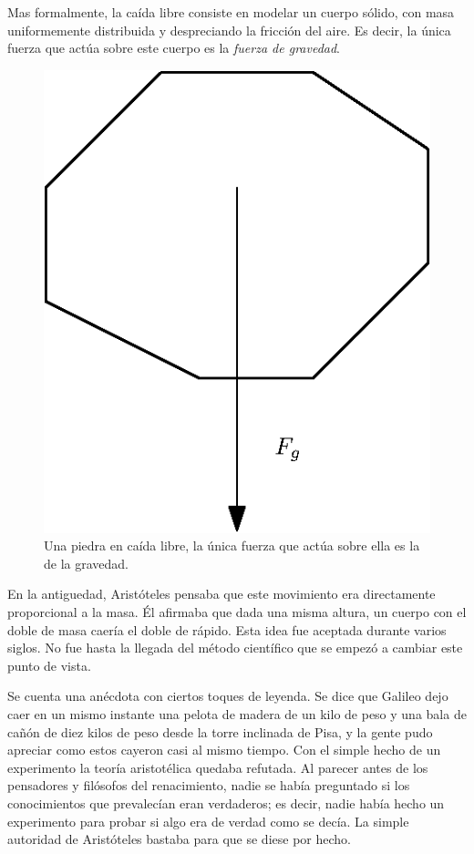Mas formalmente, la caída libre consiste en modelar un cuerpo sólido, con masa uniformemente distribuida y despreciando la fricción del aire.
Es decir, la única fuerza que actúa sobre este cuerpo es la \emph{fuerza de gravedad}.

\begin{figure}
 \centering
 \includegraphics[]{Img/01/caida_libre}
 \caption[Ejemplo de caída libre]{ 
 Una piedra en caída libre, la única fuerza que actúa sobre ella es la de la gravedad.
 } \label{piedra:fig}
\end{figure}

En la antiguedad, Aristóteles pensaba que este movimiento era directamente proporcional a la masa.
Él afirmaba que dada una misma altura, un cuerpo con el doble de masa caería el doble de rápido.
Esta idea fue aceptada durante varios siglos.
No fue hasta la llegada del método científico que se empezó a cambiar este punto de vista.

Se cuenta una anécdota con ciertos toques de leyenda.
Se dice que Galileo dejo caer en un mismo instante una pelota de madera de un kilo de peso y una bala de cañón de diez kilos de peso desde la torre inclinada de Pisa, y la gente pudo apreciar como estos cayeron casi al mismo tiempo.
Con el simple hecho de un experimento la teoría aristotélica quedaba refutada.
Al parecer antes de los pensadores y filósofos del renacimiento, nadie se había preguntado si los conocimientos que prevalecían eran verdaderos; es decir, nadie había hecho un experimento para probar si algo era de verdad como se decía.
La simple autoridad de Aristóteles bastaba para que se diese por hecho.


